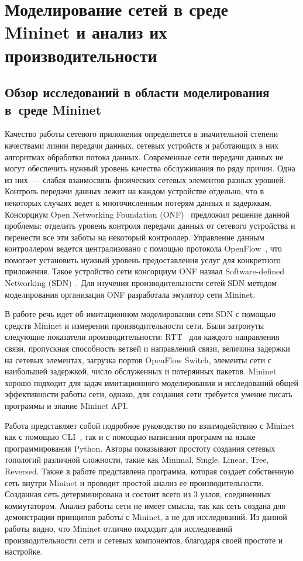 \chapter{Моделирование сетей в среде Mininet и анализ их
  производительности}

\section{Обзор исследований в области моделирования в~среде Mininet}

Качество работы сетевого приложения определяется в значительной
степени качествами линии передачи данных, сетевых устройств и
работающих в них алгоритмах обработки потока данных. Современные сети
передачи данных не могут обеспечить нужный уровень качества
обслуживания по ряду причин. Одна из них~--- слабая взаимосвязь
физических сетевых элементов разных уровней. Контроль передачи данных
лежит на каждом устройстве отдельно, что в некоторых случаях ведет к
многочисленным потерям данных и задержкам. Консорциум Open Networking
Foundation (ONF)~\cite{onf} предложил решение данной проблемы:
отделить уровень контроля передачи данных от сетевого устройства и
перенести все эти заботы на некоторый контроллер. Управление данным
контроллером ведется централизовано с помощью протокола
OpenFlow~\cite{openflow}, что помогает установить нужный уровень
предоставления услуг для конкретного приложения. Такое устройство сети
консорциум ONF назвал Software-defined Networking
(SDN)~\cite{sdn}. Для изучения производительности сетей SDN методом
моделирования организация ONF разработала эмулятор сети Mininet.

В работе \cite{article_ros} речь идет об имитационном моделировании
сети SDN с помощью средств Mininet и измерении производительности
сети.  Были затронуты следующие показатели производительности:
RTT~\cite{rtt} для каждого направления связи, пропускная способность
ветвей и направлений связи, величина задержки на сетевых элементах,
загрузка портов OpenFlow Switch, элементы сети с наибольшей задержкой,
число обслуженных и потерянных пакетов. Mininet хорошо подходит для
задач имитационного моделирования и исследований общей эффективности
работы сети, однако, для создания сети требуется умение писать
программы и знание Mininet API.

Работа \cite{article_masdntp} представляет собой подробное руководство
по взаимодействию с Mininet как с помощью CLI~\cite{cli}, так и с
помощью написания программ на языке программирования Python. Авторы
показывают простоту создания сетевых топологий различной сложности,
такие как Minimal, Single, Linear, Tree, Reversed. Также в работе
представлена программа, которая создает собственную сеть внутри
Mininet и проводит простой анализ ее производительности. Созданная
сеть детерминирована и состоит всего из 3 узлов, соединенных
коммутатором. Анализ работы сети не имеет смысла, так как сеть
создана для демонстрации принципов работы с Mininet, а не для
исследований. Из данной работы видно, что Mininet отлично подходит для
исследований производительности сети и сетевых компонентов, благодаря
своей простоте и настройке.

